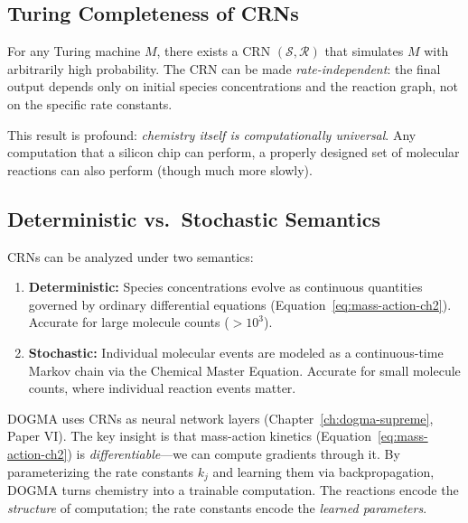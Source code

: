\subsection{Turing Completeness of CRNs}

\begin{theorem}
For any Turing machine $M$, there exists a CRN $(\mathcal{S}, \mathcal{R})$ that simulates $M$ with arbitrarily high probability. The CRN can be made \emph{rate-independent}: the final output depends only on initial species concentrations and the reaction graph, not on the specific rate constants.
\end{theorem}

This result is profound: \emph{chemistry itself is computationally universal}. Any computation that a silicon chip can perform, a properly designed set of molecular reactions can also perform (though much more slowly).

\subsection{Deterministic vs.\ Stochastic Semantics}

CRNs can be analyzed under two semantics:
\begin{enumerate}[leftmargin=1.8em]
  \item \textbf{Deterministic:} Species concentrations evolve as continuous quantities governed by ordinary differential equations (Equation~\ref{eq:mass-action-ch2}). Accurate for large molecule counts ($> 10^3$).
  \item \textbf{Stochastic:} Individual molecular events are modeled as a continuous-time Markov chain via the Chemical Master Equation. Accurate for small molecule counts, where individual reaction events matter.
\end{enumerate}

\begin{keyinsight}
DOGMA uses CRNs as neural network layers (Chapter~\ref{ch:dogma-supreme}, Paper VI). The key insight is that mass-action kinetics (Equation~\ref{eq:mass-action-ch2}) is \emph{differentiable}---we can compute gradients through it. By parameterizing the rate constants $k_j$ and learning them via backpropagation, DOGMA turns chemistry into a trainable computation. The reactions encode the \emph{structure} of computation; the rate constants encode the \emph{learned parameters}.
\end{keyinsight}

